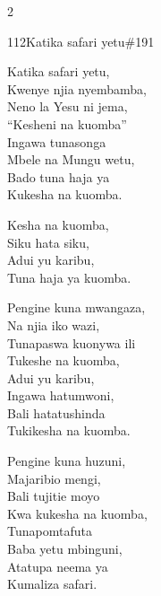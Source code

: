 \documentclass{article}
\begin{document}
\begin{multicols}{2}
\begin{hymn}{112}{Katika safari yetu}{\#191}
\begin{stanza}
Katika safari yetu,\\
Kwenye njia nyembamba,\\
Neno la Yesu ni jema,\\
``Kesheni na kuomba''\\
Ingawa tunasonga\\
Mbele na Mungu wetu,\\
Bado tuna haja ya\\
Kukesha na kuomba.
\end{stanza}
\begin{chorus}
Kesha na kuomba,\\
Siku hata siku,\\
Adui yu karibu,\\
Tuna haja ya kuomba.
\end{chorus}
\begin{stanza}
Pengine kuna mwangaza,\\
Na njia iko wazi,\\
Tunapaswa kuonywa ili\\
Tukeshe na kuomba,\\
Adui yu karibu,\\
Ingawa hatumwoni,\\
Bali hatatushinda\\
Tukikesha na kuomba.
\end{stanza}
\begin{stanza}
Pengine kuna huzuni,\\
Majaribio mengi,\\
Bali tujitie moyo\\
Kwa kukesha na kuomba,\\
Tunapomtafuta\\
Baba yetu mbinguni,\\
Atatupa neema ya\\
Kumaliza safari.
\end{stanza}
\end{hymn}


\end{multicols}
\end{document}

